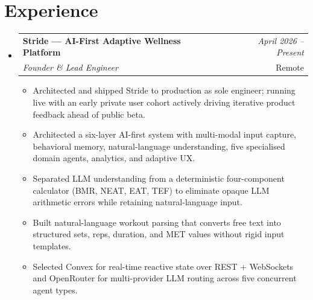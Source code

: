 \documentclass[a4paper,11pt]{article}
\makeatletter
\newcommand{\resumeSubheading}[4]{
\vspace{0.5mm}\item
    \begin{tabular*}{0.98\textwidth}[t]{l@{\extracolsep{\fill}}r}
        \textbf{#1} & \textit{\footnotesize{#4}} \\
        \textit{\footnotesize{#3}} & \footnotesize{#2}\\
    \end{tabular*}
    \vspace{-2.4mm}
}
\newcommand{\resumeSubHeadingListStart}{\begin{itemize}[leftmargin=*,labelsep=0mm]}
\newcommand{\resumeItemListStart}{\begin{justify}\begin{itemize}[leftmargin=3ex, rightmargin=2ex, noitemsep,labelsep=1.2mm,itemsep=0mm]\small}
\newcommand{\resumeSubHeadingListEnd}{\end{itemize}\vspace{2mm}}
\newcommand{\resumeItemListEnd}{\end{itemize}\end{justify}\vspace{-2mm}}
\makeatother
\begin{document}
\section{\textbf{Experience}}
\resumeSubHeadingListStart
    \resumeSubheading
      {Stride --- AI-First Adaptive Wellness Platform}{Remote}
      {Founder \& Lead Engineer}{April 2026 -- Present}
      \resumeItemListStart
        \item {Architected and shipped Stride to production as sole engineer; running live with an early private user cohort actively driving iterative product feedback ahead of public beta.}
        \item {Architected a six-layer AI-first system with multi-modal input capture, behavioral memory, natural-language understanding, five specialised domain agents, analytics, and adaptive UX.}
        \item {Separated LLM understanding from a deterministic four-component calculator (BMR, NEAT, EAT, TEF) to eliminate opaque LLM arithmetic errors while retaining natural-language input.}
        \item {Built natural-language workout parsing that converts free text into structured sets, reps, duration, and MET values without rigid input templates.}
        \item {Selected Convex for real-time reactive state over REST + WebSockets and OpenRouter for multi-provider LLM routing across five concurrent agent types.}
      \resumeItemListEnd
\resumeSubHeadingListEnd
\vspace{-5mm}

\end{document}
